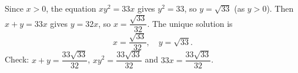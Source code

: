 Since $x>0$, the equation $xy^2=33x$ gives $y^2=33$, so $y=\sqrt{33}$ (as $y>0$). Then $x+y=33x$ gives $y=32x$, so $x=\dfrac{\sqrt{33}}{32}$. The unique solution is
\[\boxed{x=\dfrac{\sqrt{33}}{32},\quad y=\sqrt{33}}.\]
Check: $x+y=\dfrac{33\sqrt{33}}{32}$, $xy^2=\dfrac{33\sqrt{33}}{32}$ and $33x=\dfrac{33\sqrt{33}}{32}$.

